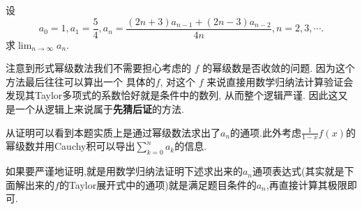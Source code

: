 \documentclass[../../main.tex]{subfiles}%
\begin{document}
\begin{example}
设
\[
a_0=1,a_1=\frac{5}{4},a_n=\frac{(2n+3)a_{n-1}+(2n-3)a_{n-2}}{4n},n=2,3,\cdots.
\]
求$\lim_{n\rightarrow \infty}a_n$.
\end{example}
\begin{remark}
注意到形式幂级数法我们不需要担心考虑的 \( f \) 的幂级数是否收敛的问题. 因为这个方法最后往往可以算出一个 具体的\( f \), 对这个 \( f \) 来说直接用数学归纳法计算验证会发现其Taylor多项式的系数恰好就是条件中的数列, 从而整个逻辑严谨. 因此这又是一个从逻辑上来说属于\textbf{先猜后证}的方法.

从证明可以看到本题实质上是通过幂级数法求出了$a_n$的通项.此外考虑$\frac{1}{1-x}f(x)$的幂级数并用Cauchy积可以导出$\sum_{k=0}^n a_k$的信息.

如果要严谨地证明,就是用数学归纳法证明下述求出来的$a_n$通项表达式(其实就是下面解出来的$f$的Taylor展开式中的通项)就是满足题目条件的$a_n$,再直接计算其极限即可.
\end{remark}
\end{document}
